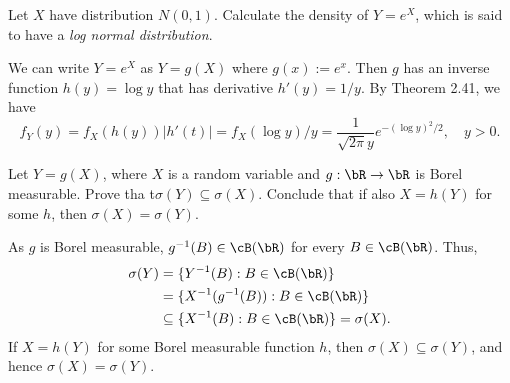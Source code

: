 \begin{exercise}
  Let $X$ have distribution $N(0,1)$. Calculate the density of $Y=e^X$, which is said to have a \textit{log normal distribution}.
\end{exercise}
\begin{solution}
  We can write $Y=e^X$ as $Y=g(X)$ where $g(x):=e^x$. Then $g$ has an inverse function $h(y)=\log y$ that has derivative $h'(y)=1/y$. By Theorem 2.41, we have
  \[
    f_Y(y)=f_X(h(y))|h'(t)| = f_X(\log y)/y = \frac{1}{\sqrt{2\pi}y}e^{-(\log y)^2/2}, \quad y>0.
  \]
\end{solution}


\begin{exercise}
  Let $Y=g(X)$, where $X$ is a random variable and $g:\bR\to\bR$ is Borel measurable. Prove tha t$\sigma(Y)\subseteq\sigma(X)$. Conclude that if also $X=h(Y)$ for some $h$, then $\sigma(X) =\sigma(Y)$.
\end{exercise}
\begin{solution}
  As $g$ is Borel measurable, $g^{-1}(B)\in\cB(\bR)$ for every $B\in\cB(\bR)$. Thus,
  \begin{align*}
    \sigma(Y) &= \{Y^{-1}(B):B\in\cB(\bR)\} \\
      &= \{X^{-1}(g^{-1}(B)):B\in\cB(\bR)\} \\
      &\subseteq \{X^{-1}(B):B\in\cB(\bR)\} = \sigma(X).
  \end{align*}
  If $X=h(Y)$ for some Borel measurable function $h$, then $\sigma(X)\subseteq \sigma(Y)$, and hence $\sigma(X)=\sigma(Y)$.
\end{solution}


